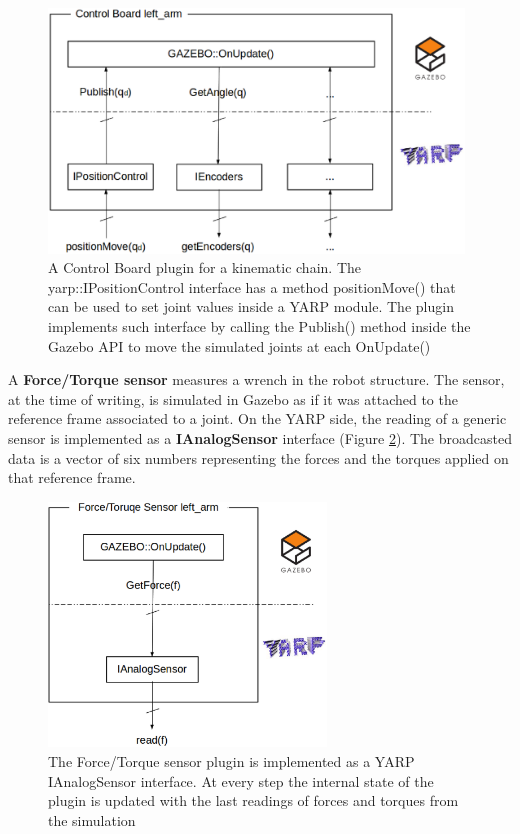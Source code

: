 \begin{figure}
  \centering
    \includegraphics[height=6.5cm]{gfx/control_board.eps}
    \caption{A Control Board plugin for a kinematic chain. The yarp::IPositionControl interface has a method positionMove() that can be used to set joint values inside a YARP module. The plugin implements such interface by calling the Publish() method inside the Gazebo API to move the simulated joints at each OnUpdate()}\label{control_board}
\end{figure}


A \textbf{Force/Torque sensor} measures a wrench in the robot structure. The sensor, at the time of writing, is simulated in Gazebo as if it was attached to the reference frame associated to a joint. On the YARP side, the reading of a generic sensor is implemented as a \textbf{IAnalogSensor} interface (Figure \ref{ianalog_force_torque}). The broadcasted data is a vector of six numbers representing the forces and the torques applied on that reference frame. 
\begin{figure}
  \centering
    \includegraphics[height=6.5cm]{gfx/ianalog_force_torque.eps}
    \caption{The Force/Torque sensor plugin is implemented as a YARP IAnalogSensor interface. At every step the internal state of the plugin is updated with the last readings of forces and torques from the simulation}\label{ianalog_force_torque}
\end{figure}


